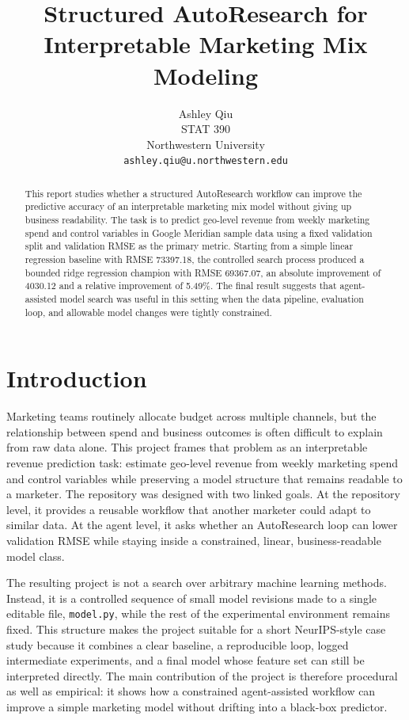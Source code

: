 \documentclass{article}
\title{Structured AutoResearch for Interpretable Marketing Mix Modeling}
\author{%
  Ashley Qiu \\
  STAT 390 \\
  Northwestern University \\
  \texttt{ashley.qiu@u.northwestern.edu}
}
\begin{document}
\maketitle

\begin{abstract}
This report studies whether a structured AutoResearch workflow can improve the predictive accuracy of an interpretable marketing mix model without giving up business readability. The task is to predict geo-level revenue from weekly marketing spend and control variables in Google Meridian sample data using a fixed validation split and validation RMSE as the primary metric. Starting from a simple linear regression baseline with RMSE 73397.18, the controlled search process produced a bounded ridge regression champion with RMSE 69367.07, an absolute improvement of 4030.12 and a relative improvement of 5.49\%. The final result suggests that agent-assisted model search was useful in this setting when the data pipeline, evaluation loop, and allowable model changes were tightly constrained.
\end{abstract}

\section{Introduction}

Marketing teams routinely allocate budget across multiple channels, but the relationship between spend and business outcomes is often difficult to explain from raw data alone. This project frames that problem as an interpretable revenue prediction task: estimate geo-level revenue from weekly marketing spend and control variables while preserving a model structure that remains readable to a marketer. The repository was designed with two linked goals. At the repository level, it provides a reusable workflow that another marketer could adapt to similar data. At the agent level, it asks whether an AutoResearch loop can lower validation RMSE while staying inside a constrained, linear, business-readable model class.

The resulting project is not a search over arbitrary machine learning methods. Instead, it is a controlled sequence of small model revisions made to a single editable file, \texttt{model.py}, while the rest of the experimental environment remains fixed. This structure makes the project suitable for a short NeurIPS-style case study because it combines a clear baseline, a reproducible loop, logged intermediate experiments, and a final model whose feature set can still be interpreted directly. The main contribution of the project is therefore procedural as well as empirical: it shows how a constrained agent-assisted workflow can improve a simple marketing model without drifting into a black-box predictor.
\end{document}

